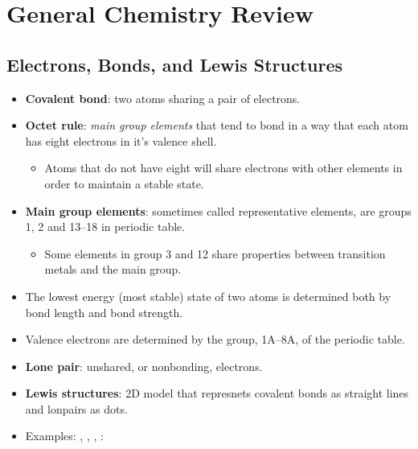 \documentclass[12pt,a4paper]{article}
\begin{document}
\tableofcontents
\cleardoublepage
\fancyhead{}

\clearpage
\clearpage
\section{General Chemistry Review}
\subsection{Electrons, Bonds, and Lewis Structures}
\begin{itemize}
    \item \textbf{Covalent bond}: two atoms sharing a pair of electrons.
    \item \textbf{Octet rule}: \textit{main group elements} that tend to bond in a way that each atom has {\color{o-Sun}eight} electrons in it's valence shell.
        \begin{itemize}
            \item Atoms that do not have eight will share electrons with other elements in order to maintain a stable state.
        \end{itemize}
    \item \textbf{Main group elements}: sometimes called representative elements, are groups 1, 2 and 13--18 in periodic table.
        \begin{itemize}
            \item Some elements in group 3 and 12 share properties between transition metals and the main group.
        \end{itemize}
    \item The lowest energy (most stable) state of two atoms is determined both by bond length and bond strength.
    \item Valence electrons are determined by the group, 1A--8A, of the periodic table.
    \item \textbf{Lone pair}: unshared, or nonbonding, electrons.
    \item \textbf{Lewis structures}: 2D model that represnets covalent bonds as straight lines and lonpairs as dots.
    \item Examples: , , , :
        \begin{align*}

\end{align*}
\end{itemize}
\end{document}
